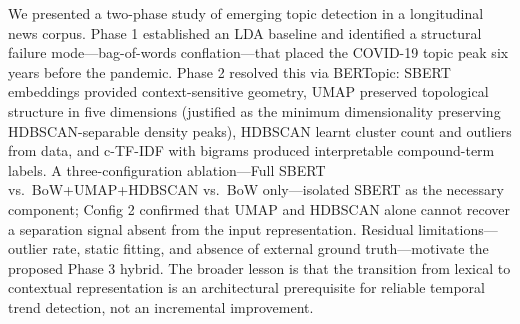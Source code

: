 \documentclass[10pt,twocolumn,a4paper]{article}
\begin{document}
We presented a two-phase study of emerging topic detection in a longitudinal news corpus. Phase 1 established an LDA baseline and identified a structural failure mode---bag-of-words conflation---that placed the COVID-19 topic peak six years before the pandemic. Phase 2 resolved this via BERTopic: SBERT embeddings provided context-sensitive geometry, UMAP preserved topological structure in five dimensions (justified as the minimum dimensionality preserving HDBSCAN-separable density peaks), HDBSCAN learnt cluster count and outliers from data, and c-TF-IDF with bigrams produced interpretable compound-term labels. A three-configuration ablation---Full SBERT vs.\ BoW+UMAP+HDBSCAN vs.\ BoW only---isolated SBERT as the necessary component; Config 2 confirmed that UMAP and HDBSCAN alone cannot recover a separation signal absent from the input representation. Residual limitations---outlier rate, static fitting, and absence of external ground truth---motivate the proposed Phase 3 hybrid. The broader lesson is that the transition from lexical to contextual representation is an architectural prerequisite for reliable temporal trend detection, not an incremental improvement.
\end{document}
